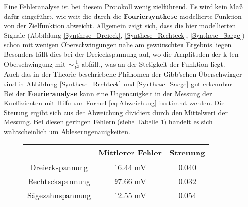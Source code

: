 Eine Fehleranalyse ist bei diesem Protokoll wenig zielführend. Es wird kein Maß dafür eingeführt, wie weit die durch die \textbf{Fouriersynthese} modellierte Funktion von der Zielfunktion abweicht. Allgemein zeigt sich, dass die hier modellierten Signale (Abbildung \ref{Synthese_Dreieck}, \ref{Synthese_Rechteck}, \ref{Synthese_Saege}) schon mit wenigen Oberschwingungen nahe am gewünschten Ergebnis liegen. Besonders fällt dies bei der Dreieckspannung auf, wo die Amplituden der k-ten Oberschwingung mit~$\sim \frac{1}{k^2}$ abfällt, was an der Stetigkeit der Funktion liegt. \\
Auch das in der Theorie beschriebene Phänomen der Gibb'schen Überschwinger sind in Abbildung \ref{Synthese_Rechteck} und \ref{Synthese_Saege} gut erkennbar. \\
Bei der \textbf{Fourieranalyse} kann eine Ungenauigkeit in der Messung der Koeffizienten mit Hilfe von Formel \eqref{eq:Abweichung} bestimmt werden. Die Steuung ergibt sich aus der Abweichung dividiert durch den Mittelwert der Messung. Bei diesen geringen Fehlern (siehe Tabelle \ref{tab:Fehler}) handelt es sich wahrscheinlich um Ableseungenauigkeiten.
\begin{figure}[h!]
	\centering
		\begin{tabular}{c|cc}
			 & Mittlerer Fehler & Streuung \\
			 \hline
			Dreieckspannung & 16.44 \si{\milli\volt} & 0.040 \\
			Rechteckspannung & 97.66 \si{\milli\volt} & 0.032 \\
			Sägezahnspannung & 12.55 \si{\milli\volt} & 0.054 \\
		\end{tabular}
		\label{tab:Fehler}
\end{figure}



